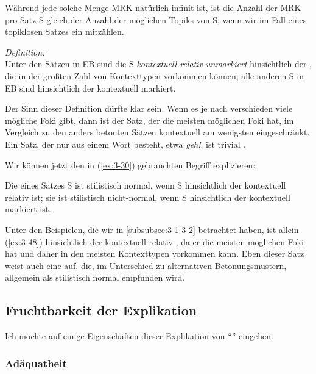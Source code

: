 \documentclass[output=paper]{langsci/langscibook}
\begin{document}
  Während jede solche Menge MRK natürlich infinit ist, ist die
  Anzahl der MRK pro Satz S gleich der Anzahl der möglichen
  Topiks von S, wenn wir im Fall eines topiklosen Satzes ein
    mitzählen.
\begin{exe}
\ex
\label{ex:3-78}
\textit{Definition:} \\
Unter den Sätzen in EB sind die S \textit{kontextuell relativ unmarkiert} hinsichtlich der , die in der größten Zahl von Kontexttypen
vorkommen können; alle anderen S in EB sind hinsichtlich der  kontextuell markiert.
\end{exe}
Der Sinn dieser Definition dürfte klar sein. Wenn es je nach 
verschieden viele mögliche Foki gibt, dann ist der Satz, der die
meisten möglichen Foki hat, im Vergleich zu den anders betonten Sätzen
kontextuell am wenigsten eingeschränkt. Ein Satz, der nur aus einem
Wort besteht, etwa \textit{geh!}, ist trivial .

Wir können jetzt den in (\ref{ex:3-30}) gebrauchten Begriff  explizieren:
\begin{exe}
\ex
\label{ex:3-79}
Die  eines Satzes S ist stilistisch normal, wenn S
hinsichtlich der  kontextuell relativ  ist; sie ist
stilistisch nicht-normal, wenn S hinsichtlich der 
kontextuell markiert ist.
\end{exe}
Unter den Beispielen, die wir in \ref{subsubsec:3-1-3-2} betrachtet haben, ist allein
 (\ref{ex:3-48}) hinsichtlich der  kontextuell relativ , da er
die meisten möglichen Foki hat und daher in den meisten Kontexttypen
vorkommen kann. Eben dieser Satz weist auch eine  auf, die, im
Unterschied zu alternativen Betonungsmustern, allgemein als
stilistisch normal empfunden wird.

\subsection{Fruchtbarkeit der Explikation}
\label{subsec:3-1-4}

Ich möchte auf einige Eigenschaften dieser Explikation von
"`"' eingehen.

\subsubsection{Adäquatheit}
\label{subsubsec:3-1-4-1}
\end{document}
